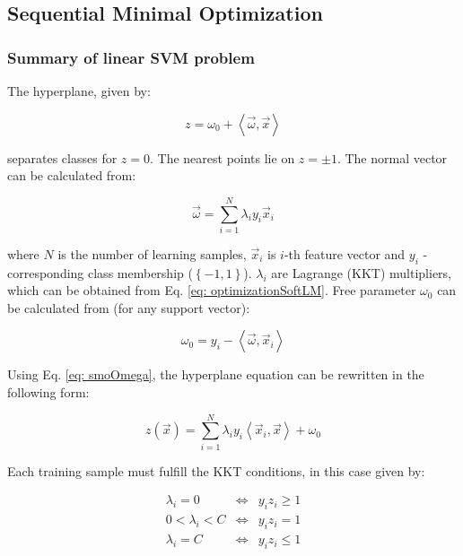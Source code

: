 \subsection{Sequential Minimal Optimization}
\label{sec: smo}

\subsubsection{Summary of linear SVM problem}

The hyperplane, given by:

\begin{equation}
 z = \omega_0 + \left<\vec\omega, \vec x\right>
\end{equation}

separates classes for $z = 0$. The nearest points lie on $z = \pm 1$. The normal vector can be calculated from:

\begin{equation}
 \vec\omega = \sum_{i=1}^{N} \lambda_i y_i \vec x_i
 \label{eq: smoOmega}
\end{equation}

where $N$ is the number of learning samples, $\vec x_i$ is $i$-th feature vector and $y_i$ - corresponding class membership ($\left\{-1, 1\right\}$). $\lambda_i$ are Lagrange (KKT) multipliers, which can be obtained from Eq. \ref{eq: optimizationSoftLM}. Free parameter $\omega_0$ can be calculated from (for any support vector):

\begin{equation}
 \omega_0 = y_i - \left<\vec\omega, \vec x_i\right>
 \label{eq: smoOmega0}
\end{equation}

Using Eq. \ref{eq: smoOmega}, the hyperplane equation can be rewritten in the following form:

\begin{equation}
 z (\vec x) = \sum_{i=1}^N \lambda_i y_i \left<\vec x_i, \vec x\right> + \omega_0
\end{equation}

Each training sample must fulfill the KKT conditions, in this case given by:

\begin{eqnarray}
 \lambda_i = 0 & \Leftrightarrow & y_i z_i \geq 1 \\
 0 < \lambda_i < C & \Leftrightarrow & y_i z_i = 1 \\
 \lambda_i = C & \Leftrightarrow & y_i z_i \leq 1
\end{eqnarray}

